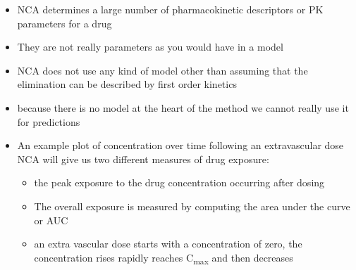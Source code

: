 \documentclass[
  letterpaper,
  DIV=11,
  numbers=noendperiod]{scrreprt}
\begin{document}
\begin{itemize}
\item
  NCA determines a large number of pharmacokinetic descriptors or PK
  parameters for a drug
\item
  They are not really parameters as you would have in a model
\item
  NCA does not use any kind of model other than assuming that the
  elimination can be described by first order kinetics
\item
  because there is no model at the heart of the method we cannot really
  use it for predictions
\item
  An example plot of concentration over time following an extravascular
  dose NCA will give us two different measures of drug exposure:

  \begin{itemize}
  \item
    the peak exposure to the drug concentration occurring after dosing
  \item
    The overall exposure is measured by computing the area under the
    curve or AUC
  \item
    an extra vascular dose starts with a concentration of zero, the
    concentration rises rapidly reaches C\textsubscript{max} and then
    decreases


\end{itemize}
\end{itemize}
\end{document}
